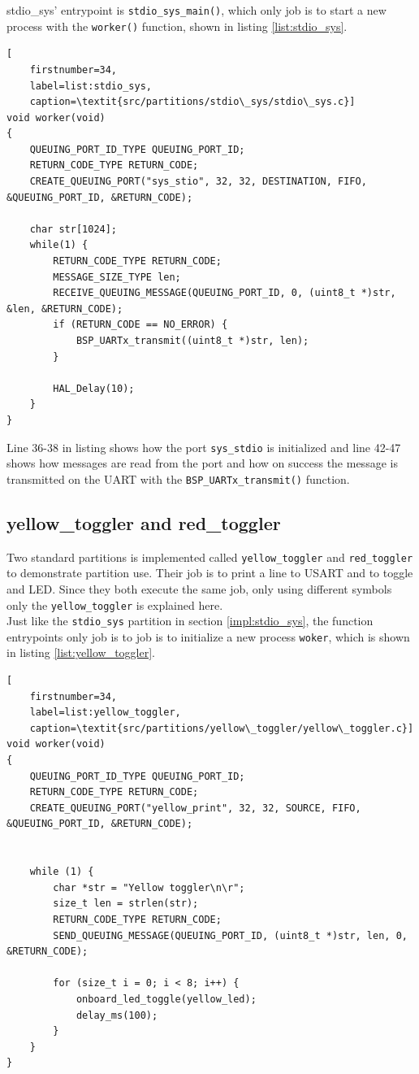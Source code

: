 stdio\_sys' entrypoint is \texttt{stdio\_sys\_main()}, which only job is to
start a new process with the \texttt{worker()} function, shown in listing
\ref{list:stdio_sys}.

\begin{minipage}{\linewidth}
\begin{lstlisting}[
	firstnumber=34,
	label=list:stdio_sys,
	caption=\textit{src/partitions/stdio\_sys/stdio\_sys.c}]
void worker(void)
{
    QUEUING_PORT_ID_TYPE QUEUING_PORT_ID;
    RETURN_CODE_TYPE RETURN_CODE;
    CREATE_QUEUING_PORT("sys_stio", 32, 32, DESTINATION, FIFO, &QUEUING_PORT_ID, &RETURN_CODE);

    char str[1024];
    while(1) {
        RETURN_CODE_TYPE RETURN_CODE;
        MESSAGE_SIZE_TYPE len;
        RECEIVE_QUEUING_MESSAGE(QUEUING_PORT_ID, 0, (uint8_t *)str, &len, &RETURN_CODE);
        if (RETURN_CODE == NO_ERROR) {
            BSP_UARTx_transmit((uint8_t *)str, len);
        }

        HAL_Delay(10);
    }
}
\end{lstlisting}
\end{minipage}

Line 36-38 in listing shows how the port \texttt{sys\_stdio} is initialized and line
42-47 shows how messages are read from the port and how on success the message
is transmitted on the UART with the \texttt{BSP\_UARTx\_transmit()} function.


\subsection{yellow\_toggler and red\_toggler}
Two standard partitions is implemented called \texttt{yellow\_toggler} and
\texttt{red\_toggler} to demonstrate partition use. Their job is to print a line
to USART and to toggle and LED. Since they both execute the same job, only using
different symbols only the \texttt{yellow\_toggler} is explained here.\\

Just like the \texttt{stdio\_sys} partition in section \ref{impl:stdio_sys}, the
function entrypoints only job is to job is to initialize a new process
\texttt{woker}, which is shown in listing \ref{list:yellow_toggler}.

\begin{minipage}{\linewidth}
\begin{lstlisting}[
	firstnumber=34,
	label=list:yellow_toggler,
	caption=\textit{src/partitions/yellow\_toggler/yellow\_toggler.c}]
void worker(void)
{
    QUEUING_PORT_ID_TYPE QUEUING_PORT_ID;
    RETURN_CODE_TYPE RETURN_CODE;
    CREATE_QUEUING_PORT("yellow_print", 32, 32, SOURCE, FIFO, &QUEUING_PORT_ID, &RETURN_CODE);


    while (1) {
        char *str = "Yellow toggler\n\r";
        size_t len = strlen(str);
        RETURN_CODE_TYPE RETURN_CODE;
        SEND_QUEUING_MESSAGE(QUEUING_PORT_ID, (uint8_t *)str, len, 0, &RETURN_CODE);

        for (size_t i = 0; i < 8; i++) {
            onboard_led_toggle(yellow_led);
            delay_ms(100);
        }
    }
}
\end{lstlisting}
\end{minipage}

